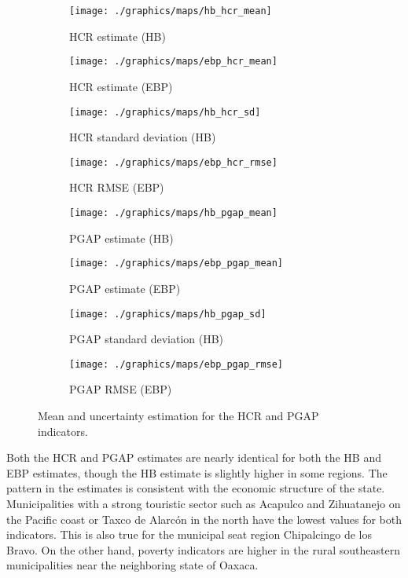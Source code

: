 \begin{figure}
    \begin{subfigure}{0.49\linewidth}
        \centering
        \texttt{[image: ./graphics/maps/hb\_hcr\_mean]}
        \caption{HCR estimate (HB)}
    \end{subfigure}
    \begin{subfigure}{0.49\linewidth}
        \centering
        \texttt{[image: ./graphics/maps/ebp\_hcr\_mean]}
        \caption{HCR estimate (EBP)}
    \end{subfigure}

    \begin{subfigure}{0.49\linewidth}
        \centering
        \texttt{[image: ./graphics/maps/hb\_hcr\_sd]}
        \caption{HCR standard deviation (HB)}
    \end{subfigure}
    \begin{subfigure}{0.49\linewidth}
        \centering
        \texttt{[image: ./graphics/maps/ebp\_hcr\_rmse]}
        \caption{HCR RMSE (EBP)}
    \end{subfigure}

    \begin{subfigure}{0.49\linewidth}
        \centering
        \texttt{[image: ./graphics/maps/hb\_pgap\_mean]}
        \caption{PGAP estimate (HB)}
    \end{subfigure}
    \begin{subfigure}{0.49\linewidth}
        \centering
        \texttt{[image: ./graphics/maps/ebp\_pgap\_mean]}
        \caption{PGAP estimate (EBP)}
    \end{subfigure}

    \begin{subfigure}{0.49\linewidth}
        \centering
        \texttt{[image: ./graphics/maps/hb\_pgap\_sd]}
        \caption{PGAP standard deviation (HB)}
    \end{subfigure}
    \begin{subfigure}{0.49\linewidth}
        \centering
        \texttt{[image: ./graphics/maps/ebp\_pgap\_rmse]}
        \caption{PGAP RMSE (EBP)}
    \end{subfigure}
    \caption{Mean and uncertainty estimation for the HCR and PGAP indicators.}
    \label{fig:maps}
\end{figure}

Both the HCR and PGAP estimates are nearly identical for both the HB and EBP estimates, though the HB estimate is slightly higher in some regions.
The pattern in the estimates is consistent with the economic structure of the state.
Municipalities with a strong touristic sector such as Acapulco and Zihuatanejo on the Pacific coast or Taxco de Alarcón in the north have the lowest values for both indicators.
This is also true for the municipal seat region Chipalcingo de los Bravo.
On the other hand, poverty indicators are higher in the rural southeastern municipalities near the neighboring state of Oaxaca.

